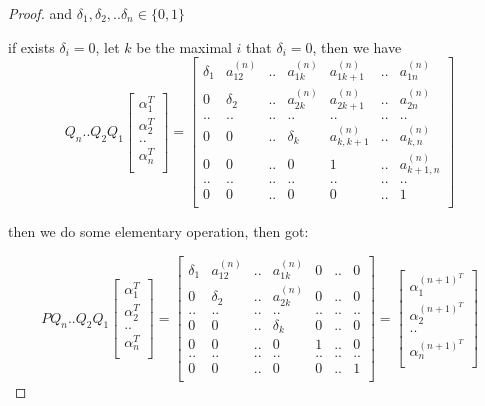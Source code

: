\begin{proof}
    and $\delta_1, \delta_2, .. \delta_n \in \{0, 1\}$ 

    if exists $\delta_i = 0$, let $k$ be the maximal $i$ that $\delta_i = 0$, then we have
    \[
    Q_n..Q_2Q_1\begin{bmatrix}
            \alpha_1^T \\
            \alpha_2^T \\
            .. \\
            \alpha_n^T \\
    \end{bmatrix} = \begin{bmatrix}
        \delta_1 & a_{12}^{(n)} & .. & a_{1k}^{(n)} & a_{1k+1}^{(n)} & .. & a_{1n}^{(n)}\\
        0 & \delta_2 & .. & a_{2k}^{(n)} & a_{2k+1}^{(n)} & .. & a_{2n}^{(n)}\\
        .. & .. & .. & .. & .. & .. & .. \\
        0 & 0 & .. & \delta_k &  a_{k,k+1}^{(n)} & ..& a_{k,n}^{(n)} \\
        0 & 0 & .. & 0 &  1 & .. & a_{k+1,n}^{(n)} \\
        .. & .. & .. & .. & .. & .. & .. \\
        0 & 0 & .. & 0 &  0 & .. & 1\\
    \end{bmatrix}
    \]

    then we do some elementary operation, then got:

    \[
    PQ_n..Q_2Q_1\begin{bmatrix}
            \alpha_1^T \\
            \alpha_2^T \\
            .. \\
            \alpha_n^T \\
    \end{bmatrix} = \begin{bmatrix}
        \delta_1 & a_{12}^{(n)} & .. & a_{1k}^{(n)} & 0 & .. & 0 \\
        0 & \delta_2 & .. & a_{2k}^{(n)} & 0 & .. & 0\\
        .. & .. & .. & .. & .. & .. & .. \\
        0 & 0 & .. & \delta_k &  0 & ..& 0 \\
        0 & 0 & .. & 0 &  1 & .. & 0 \\
        .. & .. & .. & .. & .. & .. & .. \\
        0 & 0 & .. & 0 &  0 & .. & 1\\
    \end{bmatrix}= \begin{bmatrix}
            \alpha_1^{(n+1)^T} \\
            \alpha_2^{(n+1)^T} \\
            .. \\
            \alpha_n^{(n+1)^T} \\
    \end{bmatrix}
    \]


\end{proof}
